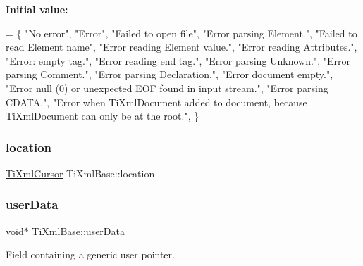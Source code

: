 {\bfseries Initial value\+:}
\begin{DoxyCode}
=
\{
    \textcolor{stringliteral}{"No error"},
    \textcolor{stringliteral}{"Error"},
    \textcolor{stringliteral}{"Failed to open file"},
    \textcolor{stringliteral}{"Error parsing Element."},
    \textcolor{stringliteral}{"Failed to read Element name"},
    \textcolor{stringliteral}{"Error reading Element value."},
    \textcolor{stringliteral}{"Error reading Attributes."},
    \textcolor{stringliteral}{"Error: empty tag."},
    \textcolor{stringliteral}{"Error reading end tag."},
    \textcolor{stringliteral}{"Error parsing Unknown."},
    \textcolor{stringliteral}{"Error parsing Comment."},
    \textcolor{stringliteral}{"Error parsing Declaration."},
    \textcolor{stringliteral}{"Error document empty."},
    \textcolor{stringliteral}{"Error null (0) or unexpected EOF found in input stream."},
    \textcolor{stringliteral}{"Error parsing CDATA."},
    \textcolor{stringliteral}{"Error when TiXmlDocument added to document, because TiXmlDocument can only be at the root."},
\}
\end{DoxyCode}
\mbox{\label{class_ti_xml_base_a0d992580f3bc264909f898e942677a3c}} 
\subsubsection{\texorpdfstring{location}{location}}
{\footnotesize\ttfamily \hyperlink{struct_ti_xml_cursor}{Ti\+Xml\+Cursor} Ti\+Xml\+Base\+::location\hspace{0.3cm}{\ttfamily [protected]}}

\mbox{\label{class_ti_xml_base_ab242c01590191f644569fa89a080d97c}} 
\subsubsection{\texorpdfstring{user\+Data}{userData}}
{\footnotesize\ttfamily void$\ast$ Ti\+Xml\+Base\+::user\+Data\hspace{0.3cm}{\ttfamily [protected]}}



Field containing a generic user pointer. 

\mbox{\label{class_ti_xml_base_ac8c86058137bdb4b413c3eca58f2d467}} 

